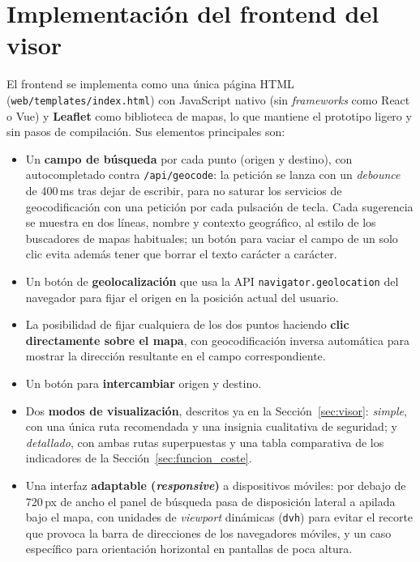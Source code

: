 \section{Implementación del frontend del visor}
\label{sec:frontend_visor}

El frontend se implementa como una única página HTML (\texttt{web/templates/index.html}) con JavaScript nativo (sin \textit{frameworks} como React o Vue) y \textbf{Leaflet} como biblioteca de mapas, lo que mantiene el prototipo ligero y sin pasos de compilación. Sus elementos principales son:

\begin{itemize}
    \item Un \textbf{campo de búsqueda} por cada punto (origen y destino), con autocompletado contra \texttt{/api/geocode}: la petición se lanza con un \textit{debounce} de 400\,ms tras dejar de escribir, para no saturar los servicios de geocodificación con una petición por cada pulsación de tecla. Cada sugerencia se muestra en dos líneas, nombre y contexto geográfico, al estilo de los buscadores de mapas habituales; un botón para vaciar el campo de un solo clic evita además tener que borrar el texto carácter a carácter.
    \item Un botón de \textbf{geolocalización} que usa la API \texttt{navigator.geolocation} del navegador para fijar el origen en la posición actual del usuario.
    \item La posibilidad de fijar cualquiera de los dos puntos haciendo \textbf{clic directamente sobre el mapa}, con geocodificación inversa automática para mostrar la dirección resultante en el campo correspondiente.
    \item Un botón para \textbf{intercambiar} origen y destino.
    \item Dos \textbf{modos de visualización}, descritos ya en la Sección~\ref{sec:visor}: \textit{simple}, con una única ruta recomendada y una insignia cualitativa de seguridad; y \textit{detallado}, con ambas rutas superpuestas y una tabla comparativa de los indicadores de la Sección~\ref{sec:funcion_coste}.
    \item Una interfaz \textbf{adaptable (\textit{responsive})} a dispositivos móviles: por debajo de 720\,px de ancho el panel de búsqueda pasa de disposición lateral a apilada bajo el mapa, con unidades de \textit{viewport} dinámicas (\texttt{dvh}) para evitar el recorte que provoca la barra de direcciones de los navegadores móviles, y un caso específico para orientación horizontal en pantallas de poca altura.
\end{itemize}

